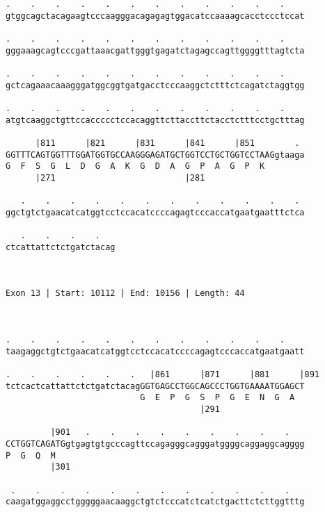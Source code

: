 \documentclass{article}
\begin{document}
\begin{Verbatim}
.    .    .    .    .    .    .    .    .    .    .    .    
gtggcagctacagaagtcccaagggacagagagtggacatccaaaagcacctccctccat
                                                            
.    .    .    .    .    .    .    .    .    .    .    .    
gggaaagcagtcccgattaaacgattgggtgagatctagagccagttggggtttagtcta
                                                            
.    .    .    .    .    .    .    .    .    .    .    .    
gctcagaaacaaagggatggcggtgatgacctcccaaggctctttctcagatctaggtgg
                                                            
.    .    .    .    .    .    .    .    .    .    .    .    
atgtcaaggctgttccaccccctccacaggttcttaccttctacctctttcctgctttag
                                                            
      |811      |821      |831      |841      |851        . 
GGTTTCAGTGGTTTGGATGGTGCCAAGGGAGATGCTGGTCCTGCTGGTCCTAAGgtaaga
G  F  S  G  L  D  G  A  K  G  D  A  G  P  A  G  P  K        
      |271                          |281                    
  
   .    .    .    .    .    .    .    .    .    .    .    . 
ggctgtctgaacatcatggtcctccacatccccagagtcccaccatgaatgaatttctca
                                                            
   .    .    .    .   
ctcattattctctgatctacag
                      
                      
 
Exon 13 | Start: 10112 | End: 10156 | Length: 44



.    .    .    .    .    .    .    .    .    .    .    .    
taagaggctgtctgaacatcatggtcctccacatccccagagtcccaccatgaatgaatt
                                                            
.    .    .    .    .    .   |861      |871      |881      |891
tctcactcattattctctgatctacagGGTGAGCCTGGCAGCCCTGGTGAAAATGGAGCT
                           G  E  P  G  S  P  G  E  N  G  A  
                                       |291                 
  
         |901   .    .    .    .    .    .    .    .    .   
CCTGGTCAGATGgtgagtgtgcccagttccagagggcagggatggggcaggaggcagggg
P  G  Q  M                                                  
         |301                                               
  
 .    .    .    .    .    .    .    .    .    .    .    .   
caagatggaggcctgggggaacaaggctgtctcccatctcatctgacttctcttggtttg
                                                            

\end{Verbatim}
\end{document}
